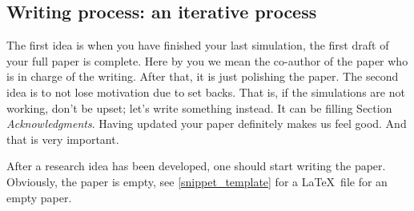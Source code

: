 \documentclass[authoryear,3p,times,preprint,review,fleqn]{elsarticle}
\numberwithin{equation}{section}
\theoremstyle{remark}
\begin{document}
\subsection{Writing process: an iterative process}\label{sec:writing-process}

The first idea is when you have finished your last simulation, the first draft of your full paper is complete. Here by you we mean the co-author of the paper who is in charge of the writing. After that, it is just polishing the paper. The second idea is to not lose motivation due to set backs. That is, if the simulations are not working, don't be upset; let's write something instead. It can be filling Section \textit{Acknowledgments}. Having updated your paper definitely makes us feel good. And that is very important. 


After a research idea has been developed, one should start writing the paper. Obviously, the paper is empty, see \cref{snippet_template} for a \LaTeX\ file for an empty paper.
\begin{figure}[!h]
\end{figure}
\end{document}
